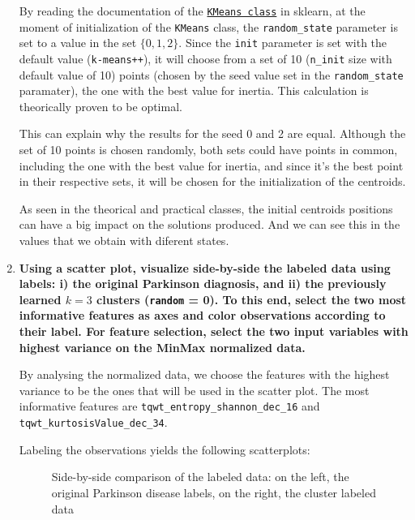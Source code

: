 \documentclass[12pt]{article}
\begin{document}
\begin{enumerate}[leftmargin=\labelsep]
          By reading the documentation of the \href{https://scikit-learn.org/stable/modules/generated/sklearn.cluster.KMeans.html}{\texttt{KMeans class}}
          in sklearn, at the moment of initialization of the \texttt{KMeans} class,
          the \texttt{random\_state} parameter is set to a value in the set $\{0,1,2\}$.
          Since the \texttt{init} parameter is set with the default value (\texttt{k-means++}),
          it will choose from a set of 10 (\texttt{n\_init} size with default value of 10) points (chosen by the seed value set in the \texttt{random\_state} paramater),
          the one with the best value for inertia. This calculation is theorically proven to be optimal.

          This can explain why the results for the seed 0 and 2 are equal.
          Although the set of 10 points is chosen randomly, both sets could have points in common,
          including the one with the best value for inertia, and since it's the best point in their respective sets, it will be chosen for the initialization of the centroids.

          As seen in the theorical and practical classes, the initial centroids positions can have a big impact on the solutions produced.
          And we can see this in the values that we obtain with diferent states.

    \item {\color{questioncolor}\bfseries
          Using a scatter plot, visualize side-by-side the labeled data using labels:
          i) the original Parkinson diagnosis, and ii) the previously learned $k = 3$
          clusters (\texttt{random} = 0).
          To this end, select the two most informative features as axes and color
          observations according to their label.
          For feature selection, select the two input variables with highest
          variance on the MinMax normalized data.
          }\\
          \vspace{0.5em}

          By analysing the normalized data, we choose the features with the highest
          variance to be the ones that will be used in the scatter plot.
          The most informative features are \texttt{tqwt\_entropy\_shannon\_dec\_16}
          and \texttt{tqwt\_kurtosisValue\_dec\_34}.

          Labeling the observations yields the following scatterplots:

          \begin{figure}[H]
              \centering
              
              \caption{Side-by-side comparison of the labeled data: on the left, the original Parkinson disease labels, on the right, the cluster labeled data}
              \label{fig:scatterplot-labels}
          \end{figure}


\end{enumerate}
\end{document}
